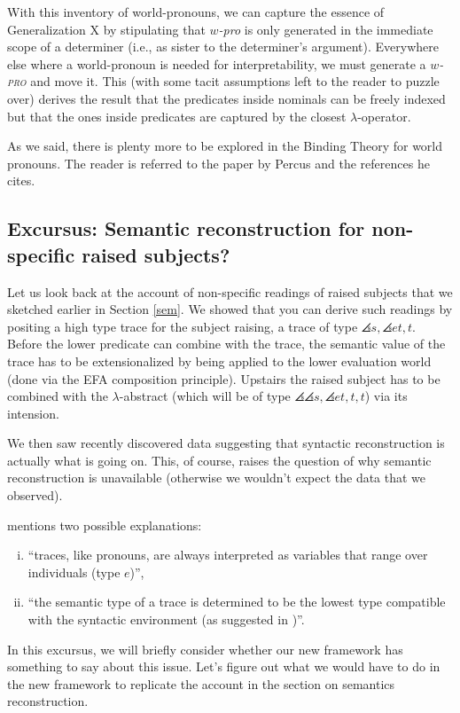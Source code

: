 With this inventory of world-pronouns, we can capture the essence of Generalization X by stipulating that \emph{$w$-pro} is only generated in the immediate scope of a determiner (i.e., as sister to the determiner's argument). Everywhere else where a world-pronoun is needed for interpretability, we must generate a \emph{$w$-\textsc{pro}} and move it. This (with some tacit assumptions left to the reader to puzzle over) derives the result that the predicates inside nominals can be freely indexed but that the ones inside predicates are captured by the closest $\lambda$-operator.

As we said, there is plenty more to be explored in the Binding Theory for world pronouns. The reader is referred to the paper by Percus and the references he cites.

\subsection{Excursus: Semantic reconstruction for non-specific raised subjects?}

Let us look back at the account of non-specific readings of raised subjects that we sketched earlier
in Section \ref{sem}. We showed that you can derive such readings by positing a high type trace for the subject raising, a trace of type $\angles{s,\angles{et,t}}$. Before the lower predicate can combine with the trace, the semantic value of the trace has to be extensionalized by being applied to the lower evaluation world (done via the EFA composition principle). Upstairs the raised subject has to be combined with the $\lambda$-abstract (which will be of type $\angles{\angles{s,\angles{et,t}},t}$) via its intension.

We then saw recently discovered data suggesting that syntactic reconstruction is actually what is going on. This, of course, raises the question of why semantic reconstruction is unavailable (otherwise we wouldn't expect the data that we observed).

\citet[p. 171, fn. 41]{fox:2000} mentions two possible explanations: 

\begin{enumerate}[(i)] 
  \item ``traces, like pronouns, are always interpreted as variables that range over individuals (type $e$)'', 
  \item ``the semantic type of a trace is determined to be the lowest type compatible with the syntactic environment (as suggested in \citet{beck:diss})''. 
\end{enumerate}
%
In this excursus, we will briefly consider whether our new framework has something to say about this issue. Let's figure out what we would have to do in the new framework to replicate the account in the section on semantics reconstruction.

